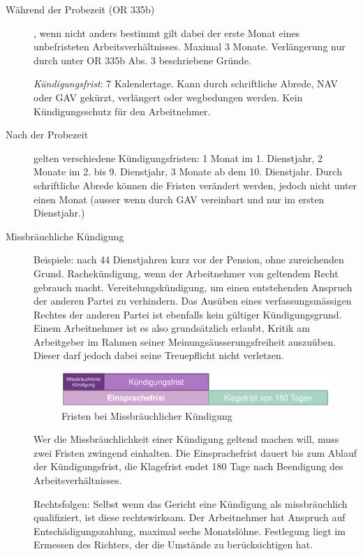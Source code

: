 \begin{description}
  \item[Während der Probezeit (OR 335b)], wenn nicht anders bestimmt gilt dabei der erste Monat eines unbefristeten Arbeitsverhältnisses. Maximal 3 Monate. Verlängerung nur durch unter OR 335b Abs. 3 beschriebene Gründe.
  
  \textit{Kündigungsfrist}: 7 Kalendertage. Kann durch schriftliche Abrede, NAV oder GAV gekürzt, verlängert oder wegbedungen werden. Kein Kündigungsschutz für den Arbeitnehmer.
  
  \item[Nach der Probezeit] gelten verschiedene Kündigungsfristen: 1 Monat im 1. Dienstjahr, 2 Monate im 2. bis 9. Dienstjahr, 3 Monate ab dem 10. Dienstjahr. Durch schriftliche Abrede können die Fristen verändert werden, jedoch nicht unter einen Monat (ausser wenn durch GAV vereinbart und nur im ersten Dienstjahr.) 
  
  \item[Missbräuchliche Kündigung]
  Beispiele: nach 44 Dienstjahren kurz vor der Pension, ohne zureichenden Grund. Rachekündigung, wenn der Arbeitnehmer von geltendem Recht gebrauch macht. Vereitelungskündigung, um einen entstehenden Anspruch der anderen Partei zu verhindern. Das Ausüben eines verfassungsmässigen Rechtes der anderen Partei ist ebenfalls kein gültiger Kündigungsgrund. Einem Arbeitnehmer ist es also grundsätzlich erlaubt, Kritik am Arbeitgeber im Rahmen seiner Meinungsäusserungsfreiheit auszuüben. Dieser darf jedoch dabei seine Treuepflicht nicht verletzen. 
  \begin{figure}[H]
    \centering
    \includegraphics[width=12cm]{res/arbeitsrecht-missbr-kuendigung-fristen.png}
    \caption{Fristen bei Missbräuchlicher Kündigung}
  \end{figure}

  Wer die Missbräuchlichkeit einer Kündigung geltend machen will, muss zwei Fristen zwingend einhalten. Die Einsprachefrist dauert bis zum Ablauf der Kündigungsfrist, die Klagefrist endet 180 Tage nach Beendigung des Arbeitsverhältnisses.

  Rechtsfolgen: Selbst wenn das Gericht eine Kündigung als missbräuchlich qualifiziert, ist diese rechtswirksam. Der Arbeitnehmer hat Anspruch auf Entschädigungszahlung, maximal sechs Monatslöhne. Festlegung liegt im Ermessen des Richters, der die Umstände zu berücksichtigen hat. 


\end{description}
